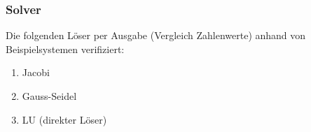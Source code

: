 \subsubsection{Solver}

Die folgenden Löser per Ausgabe (Vergleich Zahlenwerte) anhand von Beispielsystemen verifiziert:
\begin{enumerate}
	\item Jacobi
	\item Gauss-Seidel
	\item LU (direkter Löser)
\end{enumerate}